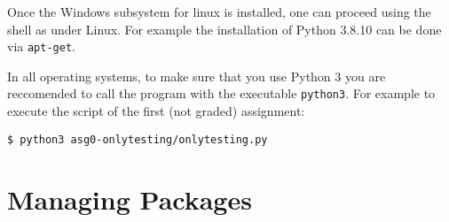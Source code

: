 Once the Windows subsystem for linux is installed, one can proceed using
the shell as under Linux. For example the installation of Python 3.8.10 can
be done via \lstinline{apt-get}.

In all operating systems, to make sure that you use Python 3 you are
reccomended to call the program with the
executable \lstinline{python3}. For example to execute the script of the
first (not graded) assignment:

\begin{lstlisting}
$ python3 asg0-onlytesting/onlytesting.py
\end{lstlisting}


\section*{Managing Packages} %

